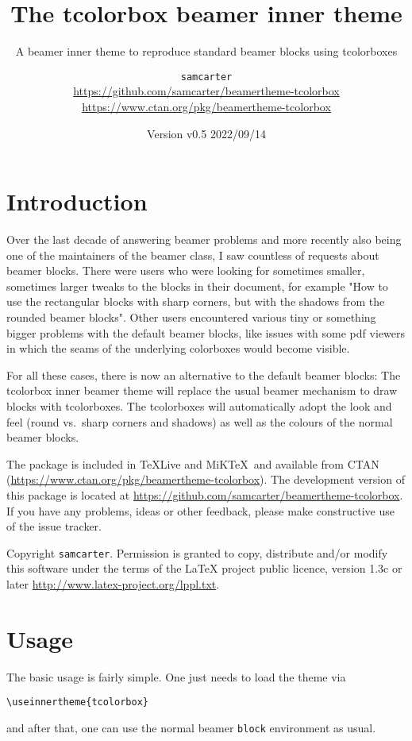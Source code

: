 \documentclass[parskip=half]{scrartcl}
\title{The tcolorbox beamer inner theme}
\subtitle{A beamer inner theme to reproduce standard beamer blocks using tcolorboxes}
\author{%
	\texorpdfstring{
		\texttt{samcarter}\\
		\url{https://github.com/samcarter/beamertheme-tcolorbox}\\
		\url{https://www.ctan.org/pkg/beamertheme-tcolorbox}
	}{samcarter}}
\date{Version v0.5 \textendash{} 2022/09/14}
\begin{document}
\maketitle

\section{Introduction}
\label{intro}

Over the last decade of answering beamer problems and more recently also being one of the maintainers of the beamer class, I saw countless of requests about beamer blocks. There were users who were looking for sometimes smaller, sometimes larger tweaks to the blocks in their document, for example "How to use the rectangular blocks with sharp corners, but with the shadows from the rounded beamer blocks". Other users encountered various tiny or something bigger problems with the default beamer blocks, like issues with some pdf viewers in which the seams of the underlying colorboxes would become visible. 

For all these cases, there is now an alternative to the default beamer blocks: The tcolorbox inner beamer theme will replace the usual beamer mechanism to draw blocks with tcolorboxes. The tcolorboxes will automatically adopt the look and feel (round vs.\ sharp corners and shadows) as well as the colours of the normal beamer blocks.

The package is included in \TeX{}Live and MiK\TeX\ and available from \textsc{CTAN} (\url{https://www.ctan.org/pkg/beamertheme-tcolorbox}). 
The development version of this package is located at \url{https://github.com/samcarter/beamertheme-tcolorbox}. If you have any problems, ideas or other feedback, please make constructive use of the issue tracker.

Copyright  \texttt{samcarter}. Permission is granted to copy, distribute and\slash or modify this software under the terms of the LaTeX project public licence, version 1.3c or later \url{http://www.latex-project.org/lppl.txt}.

\section{Usage}

The basic usage is fairly simple. One just needs to load the theme via 
\begin{tcolorbox}[title={}]
\begin{lstlisting}
\useinnertheme{tcolorbox}
\end{lstlisting}
\end{tcolorbox}
and after that, one can use the normal beamer \lstinline|block| environment as usual. 
\end{document}
